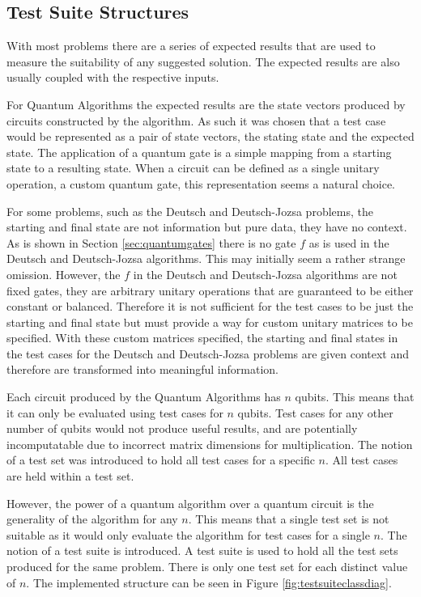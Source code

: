 \subsection{Test Suite Structures}
\label{sec:testsuitestruc}
With most problems there are a series of expected results that are used to measure the suitability of any suggested solution.
The expected results are also usually coupled with the respective inputs.

For Quantum Algorithms the expected results are the state vectors produced by circuits constructed by the algorithm.
As such it was chosen that a test case would be represented as a pair of state vectors, the stating state and the expected state.
The application of a quantum gate is a simple mapping from a starting state to a resulting state.
When a circuit can be defined as a single unitary operation, a custom quantum gate, this representation seems a natural choice.

For some problems, such as the Deutsch and Deutsch-Jozsa problems, the starting and final state are not information but pure data, they have no context.
As is shown in Section \ref{sec:quantumgates} there is no gate $f$ as is used in the Deutsch and Deutsch-Jozsa algorithms.
This may initially seem a rather strange omission.
However, the $f$ in the Deutsch and Deutsch-Jozsa algorithms are not fixed gates, they are arbitrary unitary operations that are guaranteed to be either constant or balanced.
Therefore it is not sufficient for the test cases to be just the starting and final state but must provide a way for custom unitary matrices to be specified.
With these custom matrices specified, the starting and final states in the test cases for the Deutsch and Deutsch-Jozsa problems are given context and therefore are transformed into meaningful information.

Each circuit produced by the Quantum Algorithms has $n$ qubits.
This means that it can only be evaluated using test cases for $n$ qubits.
Test cases for any other number of qubits would not produce useful results, and are potentially incomputatable due to incorrect matrix dimensions for multiplication.
The notion of a test set was introduced to hold all test cases for a specific $n$.
All test cases are held within a test set.

However, the power of a quantum algorithm over a quantum circuit is the generality of the algorithm for any $n$.
This means that a single test set is not suitable as it would only evaluate the algorithm for test cases for a single $n$.
The notion of a test suite is introduced.
A test suite is used to hold all the test sets produced for the same problem.
There is only one test set for each distinct value of $n$.
The implemented structure can be seen in Figure \ref{fig:testsuiteclassdiag}.

